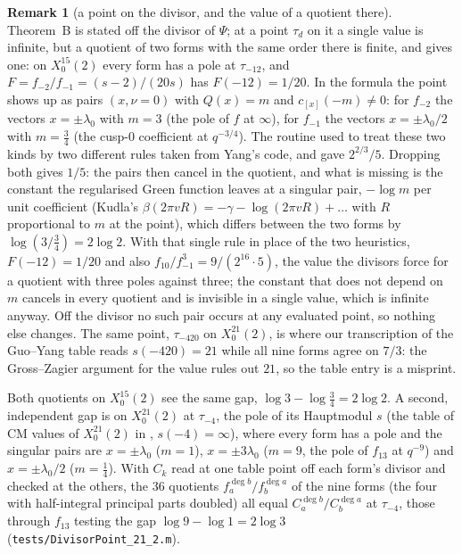 \documentclass[11pt,reqno]{amsart}
\theoremstyle{plain}
\theoremstyle{definition}
\newtheorem{remark}[theorem]{Remark}
\begin{document}
\begin{remark}[a point on the divisor, and the value of a quotient there]\label{rem:divisor}
Theorem~B is stated off the divisor of $\Psi$; at a point $\tau_d$ on it a single value is infinite,
but a quotient of two forms with the same order there is finite, and \cite[Table~45]{GY} gives one:
on $X_0^{15}(2)$ every form has a pole at $\tau_{-12}$, and $F=f_{-2}/f_{-1}=(s-2)/(20s)$ has
$F(-12)=1/20$. In the formula the point shows up as pairs $(x,\nu=0)$ with $Q(x)=m$ and
$c_{[x]}(-m)\neq0$: for $f_{-2}$ the vectors $x=\pm\lambda_0$ with $m=3$ (the pole of $f$ at $\infty$),
for $f_{-1}$ the vectors $x=\pm\lambda_0/2$ with $m=\tfrac34$ (the cusp-$0$ coefficient at $q^{-3/4}$).
The routine used to treat these two kinds by two different rules taken from Yang's code, and gave
$2^{2/3}/5$. Dropping both gives $1/5$: the pairs then cancel in the quotient, and what is missing is
the constant the regularised Green function leaves at a singular pair, $-\log m$ per unit coefficient
(Kudla's $\beta(2\pi vR)=-\gamma-\log(2\pi vR)+\dots$ with $R$ proportional to $m$ at the point),
which differs between the two forms by $\log(3/\tfrac34)=2\log2$. With that single rule in place of
the two heuristics, $F(-12)=1/20$ and also $f_{10}/f_{-1}^3=9/(2^{16}\cdot5)$, the value the divisors
force for a quotient with three poles against three; the constant that does not depend on $m$ cancels
in every quotient and is invisible in a single value, which is infinite anyway. Off the divisor no
such pair occurs at any evaluated point, so nothing else changes. The same point, $\tau_{-420}$ on
$X_0^{21}(2)$, is where our transcription of the Guo--Yang table reads $s(-420)=21$ while all nine
forms agree on $7/3$: the Gross--Zagier argument for the value rules out $21$, so the table entry is
a misprint.

Both quotients on $X_0^{15}(2)$ see the same gap, $\log3-\log\tfrac34=2\log2$. A second, independent
gap is on $X_0^{21}(2)$ at $\tau_{-4}$, the pole of its Hauptmodul $s$ (the table of CM values of $X_0^{21}(2)$ in \cite{GY},
$s(-4)=\infty$), where every form has a pole and the singular pairs are $x=\pm\lambda_0$ ($m=1$),
$x=\pm3\lambda_0$ ($m=9$, the pole of $f_{13}$ at $q^{-9}$) and $x=\pm\lambda_0/2$ ($m=\tfrac14$).
With $C_k$ read at one table point off each form's divisor and checked at the others, the $36$
quotients $f_a^{\deg b}/f_b^{\deg a}$ of the nine forms (the four with half-integral principal
parts doubled) all equal $C_a^{\deg b}/C_b^{\deg a}$ at $\tau_{-4}$, those through $f_{13}$
testing the gap $\log9-\log1=2\log3$ (\texttt{tests/DivisorPoint\_21\_2.m}).
\end{remark}
\end{document}
